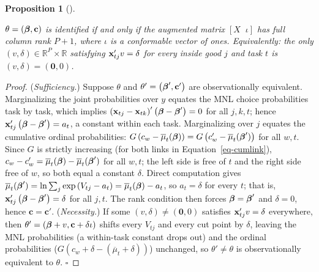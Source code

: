 \documentclass[
  letterpaper,
  DIV=11,
  numbers=noendperiod]{scrartcl}
\theoremstyle{plain}
\theoremstyle{plain}
\newtheorem{proposition}{Proposition}[section]
\theoremstyle{remark}
\begin{document}
\begin{proposition}[]\protect\hypertarget{prp-ident}{}\label{prp-ident}

\(\theta = \left( \boldsymbol{\beta}, \mathbf{c} \right)\) is identified if and
only if the augmented matrix \(\left[ X \;\; \iota \right]\) has full
column rank \(P+1\), where \(\iota\) is a conformable vector of ones.
Equivalently: the only
\(\left( v, \delta \right) \in \mathbb{R}^P \times \mathbb{R}\)
satisfying \(\mathbf{x}_{tj}'v = \delta\) for every inside good \(j\) and task
\(t\) is \(\left( v, \delta \right) = \left( \mathbf{0}, 0 \right)\).

\end{proposition}

\begin{proof}
(\emph{Sufficiency.}) Suppose \(\theta\) and
\(\theta' = \left( \boldsymbol{\beta}', \mathbf{c}' \right)\) are observationally
equivalent. Marginalizing the joint probabilities over \(y\) equates the
MNL choice probabilities task by task, which implies
\(\left( \mathbf{x}_{tj} - \mathbf{x}_{tk} \right)' \left( \boldsymbol{\beta} - \boldsymbol{\beta}' \right) = 0\)
for all \(j,k,t\); hence
\(\mathbf{x}_{tj}' \left( \boldsymbol{\beta} - \boldsymbol{\beta}' \right) = a_t\), a constant within
each task. Marginalizing over \(j\) equates the cumulative ordinal
probabilities:
\(G \left( c_w - \overline{\mu}_t(\boldsymbol{\beta}) \right) = G \left( c'_w - \overline{\mu}_t(\boldsymbol{\beta}') \right)\)
for all \(w,t\). Since \(G\) is strictly increasing (for both links in
Equation~\ref{eq-cumlink}),
\(c_w - c'_w = \overline{\mu}_t(\boldsymbol{\beta}) - \overline{\mu}_t(\boldsymbol{\beta}')\)
for all \(w,t\); the left side is free of \(t\) and the right side free
of \(w\), so both equal a constant \(\delta\). Direct computation gives
\(\overline{\mu}_t(\boldsymbol{\beta}') = \ln \sum_j \exp \left( V_{tj} - a_t \right) = \overline{\mu}_t(\boldsymbol{\beta}) - a_t\),
so \(a_t = \delta\) for every \(t\); that is,
\(\mathbf{x}_{tj}' \left( \boldsymbol{\beta} - \boldsymbol{\beta}' \right) = \delta\) for all \(j,t\).
The rank condition then forces \(\boldsymbol{\beta} = \boldsymbol{\beta}'\) and
\(\delta = 0\), hence \(\mathbf{c} = \mathbf{c}'\). (\emph{Necessity.})
If some \(\left( v, \delta \right) \ne \left( \mathbf{0}, 0 \right)\)
satisfies \(\mathbf{x}_{tj}'v = \delta\) everywhere, then
\(\theta' = \left( \boldsymbol{\beta} + v, \mathbf{c} + \delta \iota \right)\)
shifts every \(V_{tj}\) and every cut point by \(\delta\), leaving the
MNL probabilities (a within-task constant drops out) and the ordinal
probabilities (\(G(c_w + \delta - (\overline{\mu}_t + \delta))\))
unchanged, so \(\theta' \ne \theta\) is observationally equivalent to
\(\theta\). \(\square\)
\end{proof}
\end{document}

